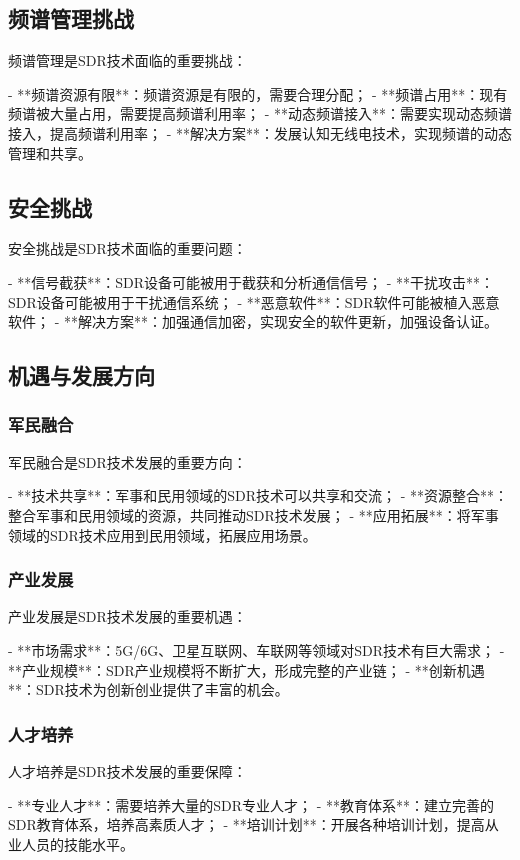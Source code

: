 ﻿\documentclass[UTF8]{ctexbook}
\begin{document}
\subsection{频谱管理挑战}

频谱管理是SDR技术面临的重要挑战：

- **频谱资源有限**：频谱资源是有限的，需要合理分配；
- **频谱占用**：现有频谱被大量占用，需要提高频谱利用率；
- **动态频谱接入**：需要实现动态频谱接入，提高频谱利用率；
- **解决方案**：发展认知无线电技术，实现频谱的动态管理和共享。

\subsection{安全挑战}

安全挑战是SDR技术面临的重要问题：

- **信号截获**：SDR设备可能被用于截获和分析通信信号；
- **干扰攻击**：SDR设备可能被用于干扰通信系统；
- **恶意软件**：SDR软件可能被植入恶意软件；
- **解决方案**：加强通信加密，实现安全的软件更新，加强设备认证。

\subsection{机遇与发展方向}

\subsubsection{军民融合}

军民融合是SDR技术发展的重要方向：

- **技术共享**：军事和民用领域的SDR技术可以共享和交流；
- **资源整合**：整合军事和民用领域的资源，共同推动SDR技术发展；
- **应用拓展**：将军事领域的SDR技术应用到民用领域，拓展应用场景。

\subsubsection{产业发展}

产业发展是SDR技术发展的重要机遇：

- **市场需求**：5G/6G、卫星互联网、车联网等领域对SDR技术有巨大需求；
- **产业规模**：SDR产业规模将不断扩大，形成完整的产业链；
- **创新机遇**：SDR技术为创新创业提供了丰富的机会。

\subsubsection{人才培养}

人才培养是SDR技术发展的重要保障：

- **专业人才**：需要培养大量的SDR专业人才；
- **教育体系**：建立完善的SDR教育体系，培养高素质人才；
- **培训计划**：开展各种培训计划，提高从业人员的技能水平。
\end{document}

